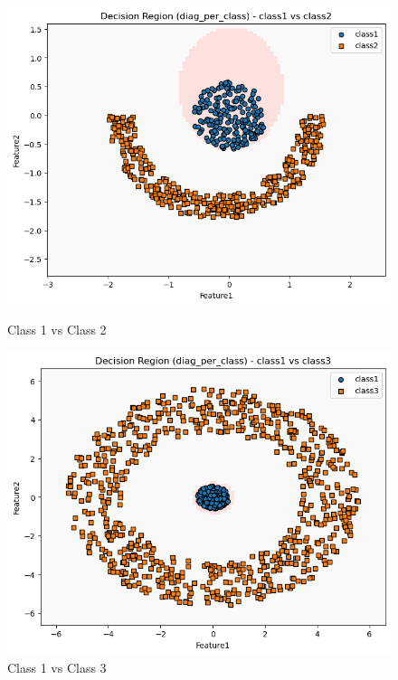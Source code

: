 \begin{figure}[H]
    \centering
    \begin{minipage}{0.32\linewidth}
        \includegraphics[width=\linewidth]{images/NLS_Group04_images/03_diag_per_class/02_decision_region_c1_c2.png}
        \caption*{Class 1 vs Class 2}
    \end{minipage}
    \hfill
    \begin{minipage}{0.32\linewidth}
        \includegraphics[width=\linewidth]{images/NLS_Group04_images/03_diag_per_class/03_decision_region_c1_c3.png}
        \caption*{Class 1 vs Class 3}
    \end{minipage}

\end{figure}
